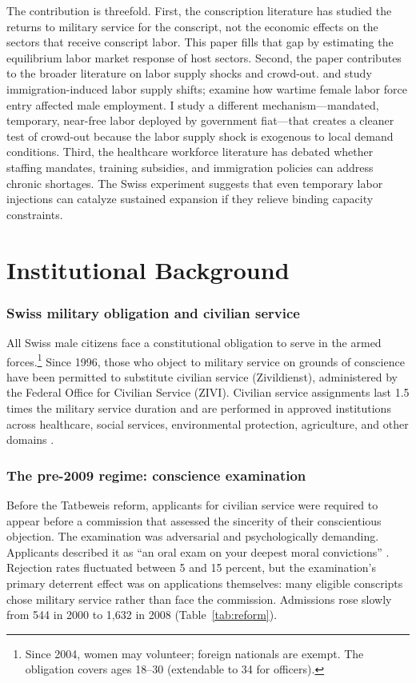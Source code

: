 \documentclass[12pt]{article}
\begin{document}
The contribution is threefold. First, the conscription literature \citep{angrist1990lifetime, imbens1994identification, bauer2012impact, galiani2011conscription, card2001estimating} has studied the returns to military service for the conscript, not the economic effects on the sectors that receive conscript labor. This paper fills that gap by estimating the equilibrium labor market response of host sectors. Second, the paper contributes to the broader literature on labor supply shocks and crowd-out. \citet{borjas2017wage} and \citet{dustmann2017labor} study immigration-induced labor supply shifts; \citet{acemoglu2004women} examine how wartime female labor force entry affected male employment. I study a different mechanism---mandated, temporary, near-free labor deployed by government fiat---that creates a cleaner test of crowd-out because the labor supply shock is exogenous to local demand conditions. Third, the healthcare workforce literature \citep{oecd2019health, buchan2019shortage} has debated whether staffing mandates, training subsidies, and immigration policies can address chronic shortages. The Swiss experiment suggests that even temporary labor injections can catalyze sustained expansion if they relieve binding capacity constraints.

\section{Institutional Background}

\subsubsection*{Swiss military obligation and civilian service} All Swiss male citizens face a constitutional obligation to serve in the armed forces.\footnote{Since 2004, women may volunteer; foreign nationals are exempt. The obligation covers ages 18--30 (extendable to 34 for officers).} Since 1996, those who object to military service on grounds of conscience have been permitted to substitute civilian service (Zivildienst), administered by the Federal Office for Civilian Service (ZIVI). Civilian service assignments last 1.5 times the military service duration and are performed in approved institutions across healthcare, social services, environmental protection, agriculture, and other domains \citep{zivi2016}.

\subsubsection*{The pre-2009 regime: conscience examination} Before the Tatbeweis reform, applicants for civilian service were required to appear before a commission that assessed the sincerity of their conscientious objection. The examination was adversarial and psychologically demanding. Applicants described it as ``an oral exam on your deepest moral convictions'' \citep{zivi2010}. Rejection rates fluctuated between 5 and 15 percent, but the examination's primary deterrent effect was on applications themselves: many eligible conscripts chose military service rather than face the commission. Admissions rose slowly from 544 in 2000 to 1,632 in 2008 (Table~\ref{tab:reform}).
\end{document}

